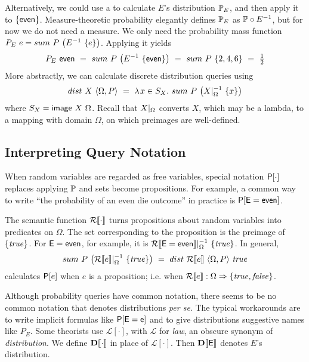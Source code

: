 Alternatively, we could use a  to calculate $E$'s distribution $\mathbb{P}_E$, and then apply it to $\{{\mathsf{even}}\}$. Measure-theoretic probability elegantly defines $\mathbb{P}_E$ as $\mathbb{P} \circ E^{-1}$, but for now we do not need a measure. We only need the probability mass function ${P_E}\ {e} = {sum}\ {P}\ {\left({E^{-1}}\ {\{{e}\}}\right)}$. Applying it yields
\begin{equation}
	{P_E}\ {\mathsf{even}}
		\ =\ {sum}\ {P}\ {\left({E^{-1}}\ {\{{\mathsf{even}}\}}\right)}
		\ =\ {sum}\ {P}\ {\{{2,4,6}\}}
		\ =\ \tfrac{1}{2}
\label{eqn:example-dist-query}
\end{equation}
More abstractly, we can calculate discrete distribution queries using
\begin{equation}
	{dist}\ {X}\ {\langle{\Omega,P}\rangle}
		\ =\ \lambda\mspace{2mu}{x \in {S_X}}\ldotp\, {{sum}\ {P}\ {\left({{X}\lvert_{\Omega}^{-1}}\ {\{{x}\}}\right)}}
\end{equation}
where $S_X = {\mathsf{image}}\ {X}\ {\Omega}$. Recall that ${X}\lvert_{\Omega}$ converts $X$, which may be a lambda, to a mapping with domain $\Omega$, on which preimages are well-defined.

\subsection{Interpreting Query Notation}

When random variables are regarded as free variables, special notation $\mathsf{P}\!\left[{\cdot}\right]$ replaces applying $\mathbb{P}$ and sets become propositions. For example, a common way to write ``the probability of an even die outcome'' in practice is $\mathsf{P}\!\left[{\mathsf{E=even}}\right]$.

The semantic function $\mathcal{R}\!\left\llbracket{\cdot}\right\rrbracket$ turns propositions about random variables into predicates on $\Omega$. The set corresponding to the proposition is the preimage of ${\{{\mathit{true}}\}}$. For $\mathsf{E=even}$, for example, it is ${{\mathcal{R}\!\left\llbracket{\mathsf{E=even}}\right\rrbracket}\lvert_{\Omega}^{-1}}\ {\{{\mathit{true}}\}}$. In general,
\begin{equation}
	{sum}\ {P}\ {\left({{\mathcal{R}\!\left\llbracket{e}\right\rrbracket}\lvert_{\Omega}^{-1}}\ {\{{\mathit{true}}\}}\right)}
		\ =\ {dist}\ {\mathcal{R}\!\left\llbracket{e}\right\rrbracket}\ {\langle{\Omega,P}\rangle}\ {\mathit{true}}
\end{equation}
calculates $\mathsf{P}\!\left[{e}\right]$ when $e$ is a proposition; i.e. when $\mathcal{R}\!\left\llbracket{e}\right\rrbracket : \Omega \Rightarrow \{{\mathit{true},\mathit{false}}\}$.

Although probability queries have common notation, there seems to be no common notation that denotes distributions \textit{per se}. The typical workarounds are to write implicit formulas like $\mathsf{P}\!\left[{\mathsf{E=e}}\right]$ and to give distributions suggestive names like $P_E$. Some theorists use $\mathcal{L}[\cdot]$, with $\mathcal{L}$ for \textit{law}, an obscure synonym of \textit{distribution}. We define $\mathbf{D}\!\left\llbracket{\cdot}\right\rrbracket$ in place of $\mathcal{L}[\cdot]$. Then $\mathbf{D}\!\left\llbracket{\mathsf{E}}\right\rrbracket$ denotes $E$'s distribution.

